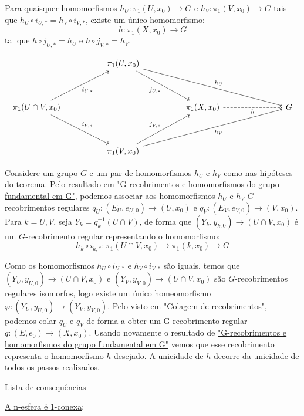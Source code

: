 \begin{thm} 
	Para quaisquer homomorfismos $h_U:\pi_1(U, x_0) \longrightarrow G$ e $h_V:\pi_1(V, x_0) \longrightarrow G$ tais que $h_U \circ i_{U, *} = h_V \circ i_{V, *}$, existe um único homomorfismo: $$h:\pi_1(X, x_0) \longrightarrow G$$ tal que $h \circ j_{U, *} = h_U$ e $h \circ j_{V, *} = h_V$.
\end{thm}

\[\begin{tikzcd}
	&& {\pi_1(U, x_0)} \\
	\\
	{\pi_1(U \cap V, x_0)} &&&& {\pi_1(X, x_0)} &&& G \\
	\\
	&& {\pi_1(V, x_0)}
	\arrow["{j_{U, *}}"', from=1-3, to=3-5]
	\arrow["{h_U}", from=1-3, to=3-8]
	\arrow["{i_{U, *}}"', from=3-1, to=1-3]
	\arrow["{i_{V, *}}", from=3-1, to=5-3]
	\arrow["h"', dashed, from=3-5, to=3-8]
	\arrow["{j_{V, *}}", from=5-3, to=3-5]
	\arrow["{h_V}"', from=5-3, to=3-8]
\end{tikzcd}\]

\begin{dem}
    Considere um grupo $G$ e um par de homomorfismos $h_U$ e $h_V$ como nas hipóteses do teorema. Pelo resultado em \hyperref[homomorfismos-e-g-recobrimentos-prop]{"G-recobrimentos e homomorfismos do grupo fundamental em G"}, podemos associar aos homomorfismos $h_U$ e $h_V$ $G$-recobrimentos regulares $q_U:(E_U,e_{U, 0}) \longrightarrow (U, x_0)$ e $q_V:(E_V,e_{V, 0}) \longrightarrow (V, x_0)$. Para $k = U, V$, seja $Y_k = q_k^{-1}(U \cap V)$, de forma que $(Y_k, y_{k, 0}) \longrightarrow (U \cap V, x_0)$ é um $G$-recobrimento regular representando o homomorfismo: $$h_k \circ i_{k, *}:  \pi_1(U \cap V, x_0) \longrightarrow \pi_1(k, x_0) \longrightarrow G$$

    Como os homomorfismos $h_U \circ i_{U, *}$ e $h_V \circ i_{V, *}$ são iguais, temos que $(Y_U, y_{U, 0}) \longrightarrow (U \cap V, x_0)$ e $(Y_V, y_{V, 0}) \longrightarrow (U \cap V, x_0)$ são $G$-recobrimentos regulares isomorfos, logo existe um único homeomorfismo $\varphi: (Y_U, y_{U, 0}) \longrightarrow (Y_V, y_{V, 0})$. Pelo visto em \hyperref[colagem-de-recobrimentos-prop]{"Colagem de recobrimentos"}, podemos colar $q_U$ e $q_V$ de forma a obter um G-recobrimento regular $q:(E, e_0) \longrightarrow (X, x_0)$. Usando novamente o resultado de \hyperref[homomorfismos-e-g-recobrimentos-prop]{"G-recobrimentos e homomorfismos do grupo fundamental em G"} vemos que esse recobrimento representa o homomorfismo $h$ desejado. A unicidade de $h$ decorre da unicidade de todos os passos realizados.
\end{dem}

\begin{titlemize}{Lista de consequências}
	\item \hyperref[n-esfera-1-conexa-ex]{A n-esfera é 1-conexa};
\end{titlemize}
